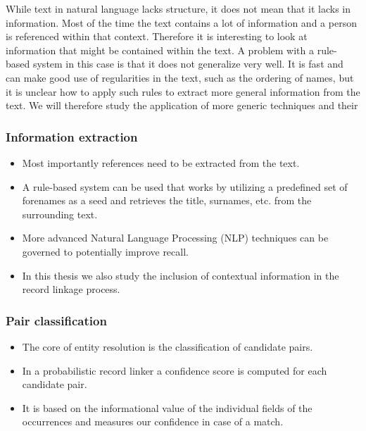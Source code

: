 \documentclass[paper=a4, fontsize=11pt]{scrartcl}
\begin{document}
While text in natural language lacks structure, it does not mean that it lacks in information.
Most of the time the text contains a lot of information and a person is referenced within that context.
Therefore it is interesting to look at information that might be contained within the text.
A problem with a rule-based system in this case is that it does not generalize very well.
It is fast and can make good use of regularities in the text, such as the ordering of names, but it is unclear how to apply such rules to extract more general information from the text.
We will therefore study the application of more generic techniques and their 


\subsubsection{Information extraction}
\begin{itemize}
	\item Most importantly references need to be extracted from the text.
	\item A rule-based system can be used that works by utilizing a predefined set of forenames as a seed and retrieves the title, surnames, etc. from the surrounding text.
	\item More advanced Natural Language Processing (NLP) techniques can be governed to potentially improve recall.
	\item In this thesis we also study the inclusion of contextual information in the record linkage process.
\end{itemize}

\subsubsection{Pair classification}
\begin{itemize}
	\item The core of entity resolution is the classification of candidate pairs.
	\item In a probabilistic record linker a confidence score is computed for each candidate pair.
	\item It is based on the informational value of the individual fields of the occurrences and measures our confidence in case of a match.
\end{itemize}
\end{document}
